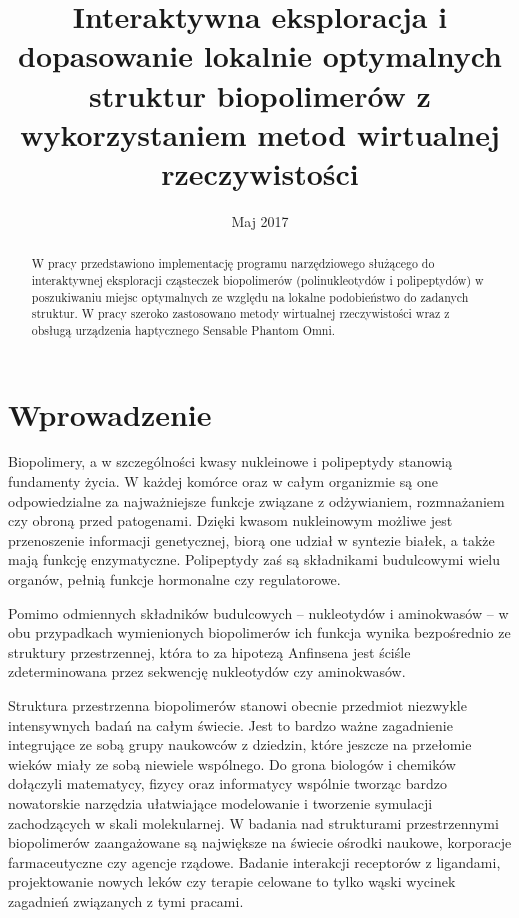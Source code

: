 \documentclass[licencjacka]{pracamgr}
\title{Interaktywna eksploracja i dopasowanie lokalnie optymalnych struktur biopolimerów z wykorzystaniem metod wirtualnej rzeczywistości}
\date{Maj 2017}
\begin{document}
\boldmath		%

\maketitle

\begin{abstract}
W pracy przedstawiono implementację programu narzędziowego służącego do interaktywnej eksploracji cząsteczek biopolimerów (polinukleotydów i polipeptydów) w poszukiwaniu miejsc optymalnych ze względu na lokalne podobieństwo do zadanych struktur. W pracy szeroko zastosowano metody wirtualnej rzeczywistości wraz z obsługą urządzenia haptycznego Sensable Phantom Omni.
\end{abstract}

\tableofcontents

\chapter*{Wprowadzenie}
Biopolimery, a w szczególności kwasy nukleinowe i polipeptydy stanowią fundamenty życia. W każdej komórce oraz w całym organizmie są one odpowiedzialne za najważniejsze funkcje związane z odżywianiem, rozmnażaniem czy obroną przed patogenami. Dzięki kwasom nukleinowym możliwe jest przenoszenie informacji genetycznej, biorą one udział w syntezie białek, a także mają funkcję enzymatyczne. Polipeptydy zaś są składnikami budulcowymi wielu organów, pełnią funkcje hormonalne czy regulatorowe.

Pomimo odmiennych składników budulcowych – nukleotydów i aminokwasów – w obu przypadkach wymienionych biopolimerów ich funkcja wynika bezpośrednio ze struktury przestrzennej, która to za hipotezą Anfinsena \cite{anfinsen73} jest ściśle zdeterminowana przez sekwencję nukleotydów czy aminokwasów.

Struktura przestrzenna biopolimerów stanowi obecnie przedmiot niezwykle intensywnych badań na całym świecie. Jest to bardzo ważne zagadnienie integrujące ze sobą grupy naukowców z dziedzin, które jeszcze na przełomie wieków miały ze sobą niewiele wspólnego. Do grona biologów i chemików dołączyli matematycy, fizycy oraz informatycy wspólnie tworząc bardzo nowatorskie narzędzia ułatwiające modelowanie i tworzenie symulacji zachodzących w skali molekularnej. W badania nad strukturami przestrzennymi biopolimerów zaangażowane są największe na świecie ośrodki naukowe, korporacje farmaceutyczne czy agencje rządowe. Badanie interakcji receptorów z ligandami, projektowanie nowych leków czy terapie celowane to tylko wąski wycinek zagadnień związanych z tymi pracami.
\end{document}
